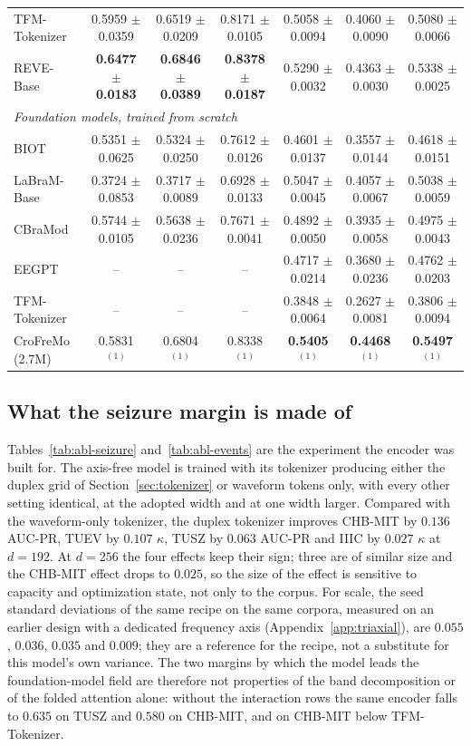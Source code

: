 \begin{table}[t]
{\begin{tabular}{lcccccc}
TFM-Tokenizer & 0.5959 $\pm$ 0.0359 & 0.6519 $\pm$ 0.0209 & 0.8171 $\pm$ 0.0105 & 0.5058 $\pm$ 0.0094 & 0.4060 $\pm$ 0.0090 & 0.5080 $\pm$ 0.0066 \\
REVE-Base & \textbf{0.6477 $\pm$ 0.0183} & \textbf{0.6846 $\pm$ 0.0389} & \textbf{0.8378 $\pm$ 0.0187} & 0.5290 $\pm$ 0.0032 & 0.4363 $\pm$ 0.0030 & 0.5338 $\pm$ 0.0025 \\
\midrule
\multicolumn{7}{l}{\textit{Foundation models, trained from scratch}} \\
BIOT & 0.5351 $\pm$ 0.0625 & 0.5324 $\pm$ 0.0250 & 0.7612 $\pm$ 0.0126 & 0.4601 $\pm$ 0.0137 & 0.3557 $\pm$ 0.0144 & 0.4618 $\pm$ 0.0151 \\
LaBraM-Base & 0.3724 $\pm$ 0.0853 & 0.3717 $\pm$ 0.0089 & 0.6928 $\pm$ 0.0133 & 0.5047 $\pm$ 0.0045 & 0.4057 $\pm$ 0.0067 & 0.5038 $\pm$ 0.0059 \\
CBraMod & 0.5744 $\pm$ 0.0105 & 0.5638 $\pm$ 0.0236 & 0.7671 $\pm$ 0.0041 & 0.4892 $\pm$ 0.0050 & 0.3935 $\pm$ 0.0058 & 0.4975 $\pm$ 0.0043 \\
EEGPT & -- & -- & -- & 0.4717 $\pm$ 0.0214 & 0.3680 $\pm$ 0.0236 & 0.4762 $\pm$ 0.0203 \\
TFM-Tokenizer & -- & -- & -- & 0.3848 $\pm$ 0.0064 & 0.2627 $\pm$ 0.0081 & 0.3806 $\pm$ 0.0094 \\
\midrule
CroFreMo (2.7M) & 0.5831$^{(1)}$ & 0.6804$^{(1)}$ & 0.8338$^{(1)}$ & \textbf{0.5405$^{(1)}$} & \textbf{0.4468$^{(1)}$} & \textbf{0.5497$^{(1)}$} \\
\bottomrule
\end{tabular}}
\end{table}

\subsection{What the seizure margin is made of}
\label{sec:attribution}

Tables~\ref{tab:abl-seizure} and~\ref{tab:abl-events} are the experiment the encoder was built for.
The axis-free model is trained with its tokenizer producing either the
duplex grid of Section~\ref{sec:tokenizer} or waveform tokens only, with
every other setting identical, at the adopted width and at one width
larger. Compared with the waveform-only tokenizer, the duplex tokenizer improves
CHB-MIT by $0.136$ AUC-PR, TUEV by $0.107$ $\kappa$, TUSZ by $0.063$ AUC-PR
and IIIC by $0.027$ $\kappa$ at $d{=}192$. At $d{=}256$ the four effects keep their sign; three
are of similar size and the CHB-MIT effect drops to $0.025$, so the size
of the effect is sensitive to capacity and optimization state, not only
to the corpus. For scale, the seed standard deviations of the same
recipe on the same corpora, measured on an earlier design with a
dedicated frequency axis (Appendix~\ref{app:triaxial}), are $0.055$, $0.036$, $0.035$ and $0.009$; they
are a reference for the recipe, not a substitute for this model's own
variance. The two margins by which the model leads the
foundation-model field are therefore not properties of the band
decomposition or of the folded attention alone: without the interaction
rows the same encoder falls to $0.635$ on TUSZ and $0.580$ on CHB-MIT,
and on CHB-MIT below TFM-Tokenizer.

